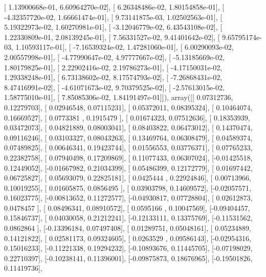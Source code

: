 \documentclass{article}
\begin{document}
       [  1.13900668e-01,   6.60964270e-02],
       [  6.26348486e-02,   1.80154858e-01],
       [ -4.32357720e-02,   1.66661474e-01],
       [  9.73141875e-03,   1.02502563e-01],
       [  5.19322973e-02,   1.60270981e-01],
       [ -3.12046779e-02,   6.43543108e-02],
       [  1.22330809e-01,   2.08139245e-01],
       [  7.56331527e-02,   9.41401642e-02],
       [  9.65795174e-03,   1.10593117e-01],
       [ -7.16539324e-02,   1.47281060e-01],
       [  6.00290093e-02,   2.00557998e-01],
       [ -4.77990647e-02,   4.97777667e-02],
       [ -5.13185669e-02,   1.80179825e-01],
       [  2.22902416e-02,   2.19786273e-01],
       [ -4.17150031e-02,   1.29338248e-01],
       [  6.73138602e-02,   8.17574793e-02],
       [ -7.26868431e-02,   8.47416991e-02],
       [ -4.61071673e-02,   9.70379525e-02],
       [ -2.57613015e-02,   1.58775010e-01],
       [  7.85085306e-02,   1.84191497e-01]]), array([[ 0.07312736,  0.12279703],
       [ 0.02946548,  0.07115231],
       [ 0.05372011,  0.08395324],
       [ 0.10464074,  0.16669527],
       [ 0.0773381 ,  0.1915479 ],
       [ 0.01674323,  0.07512636],
       [ 0.18353939,  0.03472073],
       [ 0.04821889,  0.08003041],
       [ 0.08403822,  0.06473012],
       [ 0.14370474,  0.09116246],
       [ 0.03103327,  0.08043263],
       [ 0.13469764,  0.06308479],
       [ 0.04589374,  0.07489825],
       [ 0.00646341,  0.19423744],
       [ 0.01556553,  0.03776371],
       [ 0.07765233,  0.22382758],
       [ 0.07940498,  0.17209869],
       [ 0.11077433,  0.06307024],
       [-0.01425518,  0.12449052],
       [-0.01667982,  0.21034399],
       [ 0.05486399,  0.12172779],
       [ 0.01697442,  0.06725827],
       [ 0.05693079,  0.22825181],
       [ 0.0425444 ,  0.22924846],
       [ 0.00713966,  0.10019255],
       [ 0.01605875,  0.0856495 ],
       [ 0.03903798,  0.14609572],
       [-0.02057571,  0.16023775],
       [-0.00813652,  0.11272577],
       [-0.04930817,  0.07728804],
       [ 0.02612873,  0.0478457 ],
       [ 0.08496341,  0.08910572],
       [ 0.0595166 ,  0.10047569],
       [-0.09404457,  0.15846737],
       [ 0.04030058,  0.21212241],
       [-0.12133111,  0.13375769],
       [-0.11531562,  0.0862864 ],
       [-0.13396184,  0.07497408],
       [ 0.01289751,  0.05048161],
       [ 0.05234889,  0.14121822],
       [ 0.02581173,  0.09324605],
       [ 0.0263529 ,  0.09586143],
       [-0.02954316,  0.15016233],
       [-0.11221338,  0.19294232],
       [-0.10893676,  0.11445705],
       [-0.07198029,  0.22710397],
       [-0.10238141,  0.11396001],
       [-0.09875873,  0.18676965],
       [-0.19501826,  0.11419736],
\end{document}
